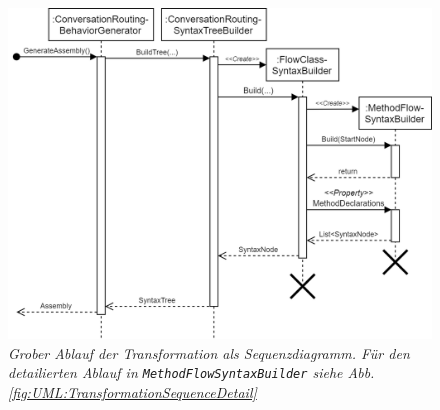 \begin{figure} %
	\centering
		\includegraphics[width=\textwidth]{img/TransformationSequence.png}
	\caption[Transformatinosablauf]{\textit{Grober Ablauf der Transformation als Sequenzdiagramm. Für den detailierten Ablauf in \texttt{MethodFlowSyntaxBuilder} siehe Abb. \ref{fig:UML:TransformationSequenceDetail} }}
	\label{fig:UML:TransformationSequence}
\end{figure}


